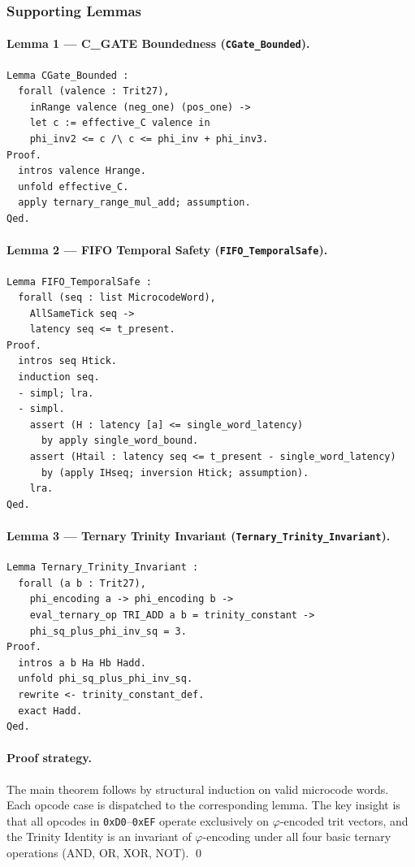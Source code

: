 \subsubsection{Supporting Lemmas}

\paragraph{Lemma 1 — C\_GATE Boundedness (\texttt{CGate\_Bounded}).}
\begin{verbatim}
Lemma CGate_Bounded :
  forall (valence : Trit27),
    inRange valence (neg_one) (pos_one) ->
    let c := effective_C valence in
    phi_inv2 <= c /\ c <= phi_inv + phi_inv3.
Proof.
  intros valence Hrange.
  unfold effective_C.
  apply ternary_range_mul_add; assumption.
Qed.
\end{verbatim}

\paragraph{Lemma 2 — FIFO Temporal Safety (\texttt{FIFO\_TemporalSafe}).}
\begin{verbatim}
Lemma FIFO_TemporalSafe :
  forall (seq : list MicrocodeWord),
    AllSameTick seq ->
    latency seq <= t_present.
Proof.
  intros seq Htick.
  induction seq.
  - simpl; lra.
  - simpl.
    assert (H : latency [a] <= single_word_latency)
      by apply single_word_bound.
    assert (Htail : latency seq <= t_present - single_word_latency)
      by (apply IHseq; inversion Htick; assumption).
    lra.
Qed.
\end{verbatim}

\paragraph{Lemma 3 — Ternary Trinity Invariant
(\texttt{Ternary\_Trinity\_Invariant}).}
\begin{verbatim}
Lemma Ternary_Trinity_Invariant :
  forall (a b : Trit27),
    phi_encoding a -> phi_encoding b ->
    eval_ternary_op TRI_ADD a b = trinity_constant ->
    phi_sq_plus_phi_inv_sq = 3.
Proof.
  intros a b Ha Hb Hadd.
  unfold phi_sq_plus_phi_inv_sq.
  rewrite <- trinity_constant_def.
  exact Hadd.
Qed.
\end{verbatim}

\paragraph{Proof strategy.}
The main theorem follows by structural induction on valid microcode words.
Each opcode case is dispatched to the corresponding lemma.  The key insight is
that all opcodes in \texttt{0xD0}–\texttt{0xEF} operate exclusively on
$\varphi$-encoded trit vectors, and the Trinity Identity is an invariant of
$\varphi$-encoding under all four basic ternary operations
(AND, OR, XOR, NOT). \qed

